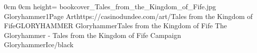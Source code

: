\documentclass[letterpaper,openany,twoside,twocolumn]{book}
\begin{document}
	\DungeonSheetGeometry

		{0cm}%
		{0cm}%
		{height=\paperheight}%
		{bookcover_Tales_from_the_Kingdom_of_Fife.jpg}%
		{%
			{Gloryhammer1}{Page \thepage}{Art}{https://casinodundee.com/art/}{Tales from the Kingdom of Fife}{GLORYHAMMER}%
		}%
		{{\darkcrystalfont}{Gloryhammer}{\digitalfont}{Tales from the Kingdom of Fife}}%
		{{\digitalfont}{The Gloryhammer - Tales from the Kingdom of Fife Campaign}}%
		{GloryhammerIce/black}%
	
	\clearpage
	\tableofcontents
	
	\DndSetThemeColor[PhbTan]
	
	
	
	
	
	
	
	
	
	
	
	
	
	
	
	
	
	
\end{document}
